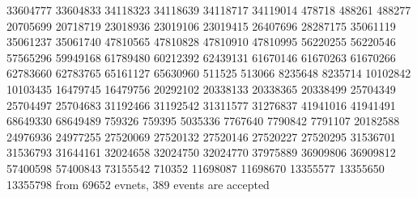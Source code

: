 33604777
33604833
34118323
34118639
34118717
34119014
478718
488261
488277
20705699
20718719
23018936
23019106
23019415
26407696
28287175
35061119
35061237
35061740
47810565
47810828
47810910
47810995
56220255
56220546
57565296
59949168
61789480
60212392
62439131
61670146
61670263
61670266
62783660
62783765
65161127
65630960
511525
513066
8235648
8235714
10102842
10103435
16479745
16479756
20292102
20338133
20338365
20338499
25704349
25704497
25704683
31192466
31192542
31311577
31276837
41941016
41941491
68649330
68649489
759326
759395
5035336
7767640
7790842
7791107
20182588
24976936
24977255
27520069
27520132
27520146
27520227
27520295
31536701
31536793
31644161
32024658
32024750
32024770
37975889
36909806
36909812
57400598
57400843
73155542
710352
11698087
11698670
13355577
13355650
13355798
from 69652 evnets, 389 events are accepted
